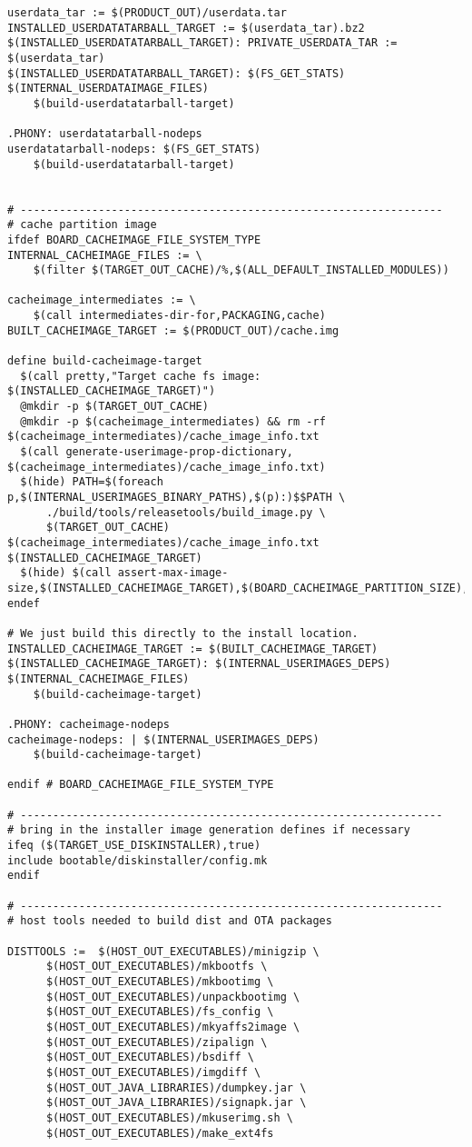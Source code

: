 \documentclass[12pt,a4paper]{article}
\begin{document}
\begin{verbatim}
userdata_tar := $(PRODUCT_OUT)/userdata.tar
INSTALLED_USERDATATARBALL_TARGET := $(userdata_tar).bz2
$(INSTALLED_USERDATATARBALL_TARGET): PRIVATE_USERDATA_TAR := $(userdata_tar)
$(INSTALLED_USERDATATARBALL_TARGET): $(FS_GET_STATS) $(INTERNAL_USERDATAIMAGE_FILES)
	$(build-userdatatarball-target)

.PHONY: userdatatarball-nodeps
userdatatarball-nodeps: $(FS_GET_STATS)
	$(build-userdatatarball-target)


# -----------------------------------------------------------------
# cache partition image
ifdef BOARD_CACHEIMAGE_FILE_SYSTEM_TYPE
INTERNAL_CACHEIMAGE_FILES := \
    $(filter $(TARGET_OUT_CACHE)/%,$(ALL_DEFAULT_INSTALLED_MODULES))

cacheimage_intermediates := \
    $(call intermediates-dir-for,PACKAGING,cache)
BUILT_CACHEIMAGE_TARGET := $(PRODUCT_OUT)/cache.img

define build-cacheimage-target
  $(call pretty,"Target cache fs image: $(INSTALLED_CACHEIMAGE_TARGET)")
  @mkdir -p $(TARGET_OUT_CACHE)
  @mkdir -p $(cacheimage_intermediates) && rm -rf $(cacheimage_intermediates)/cache_image_info.txt
  $(call generate-userimage-prop-dictionary, $(cacheimage_intermediates)/cache_image_info.txt)
  $(hide) PATH=$(foreach p,$(INTERNAL_USERIMAGES_BINARY_PATHS),$(p):)$$PATH \
      ./build/tools/releasetools/build_image.py \
      $(TARGET_OUT_CACHE) $(cacheimage_intermediates)/cache_image_info.txt $(INSTALLED_CACHEIMAGE_TARGET)
  $(hide) $(call assert-max-image-size,$(INSTALLED_CACHEIMAGE_TARGET),$(BOARD_CACHEIMAGE_PARTITION_SIZE),yaffs)
endef

# We just build this directly to the install location.
INSTALLED_CACHEIMAGE_TARGET := $(BUILT_CACHEIMAGE_TARGET)
$(INSTALLED_CACHEIMAGE_TARGET): $(INTERNAL_USERIMAGES_DEPS) $(INTERNAL_CACHEIMAGE_FILES)
	$(build-cacheimage-target)

.PHONY: cacheimage-nodeps
cacheimage-nodeps: | $(INTERNAL_USERIMAGES_DEPS)
	$(build-cacheimage-target)

endif # BOARD_CACHEIMAGE_FILE_SYSTEM_TYPE

# -----------------------------------------------------------------
# bring in the installer image generation defines if necessary
ifeq ($(TARGET_USE_DISKINSTALLER),true)
include bootable/diskinstaller/config.mk
endif

# -----------------------------------------------------------------
# host tools needed to build dist and OTA packages

DISTTOOLS :=  $(HOST_OUT_EXECUTABLES)/minigzip \
	  $(HOST_OUT_EXECUTABLES)/mkbootfs \
	  $(HOST_OUT_EXECUTABLES)/mkbootimg \
	  $(HOST_OUT_EXECUTABLES)/unpackbootimg \
	  $(HOST_OUT_EXECUTABLES)/fs_config \
	  $(HOST_OUT_EXECUTABLES)/mkyaffs2image \
	  $(HOST_OUT_EXECUTABLES)/zipalign \
	  $(HOST_OUT_EXECUTABLES)/bsdiff \
	  $(HOST_OUT_EXECUTABLES)/imgdiff \
	  $(HOST_OUT_JAVA_LIBRARIES)/dumpkey.jar \
	  $(HOST_OUT_JAVA_LIBRARIES)/signapk.jar \
	  $(HOST_OUT_EXECUTABLES)/mkuserimg.sh \
	  $(HOST_OUT_EXECUTABLES)/make_ext4fs


\end{verbatim}
\end{document}
